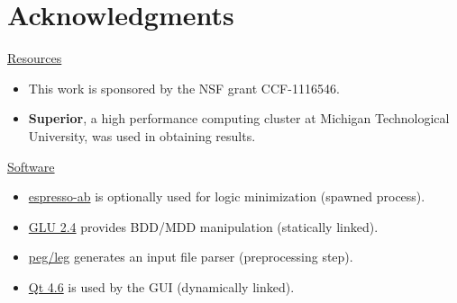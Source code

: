 
\section{Acknowledgments}

\underline{Resources}
\begin{itemize}
\item This work is sponsored by the NSF grant CCF-1116546.
\item \textbf{Superior}, a high performance computing cluster at Michigan Technological University, was used in obtaining results.
\end{itemize}

\underline{Software}
\begin{itemize}
\item \href{http://code.google.com/p/eqntott/downloads/detail?name=espresso-ab-1.0.tar.gz}{espresso-ab} is optionally used for logic minimization (spawned process).
\item \href{http://vlsi.colorado.edu/~vis/Readme/README.glu}{GLU 2.4} provides BDD/MDD manipulation (statically linked).
\item \href{http://piumarta.com/software/peg/}{peg/leg} generates an input file parser (preprocessing step).
\item \href{http://qt-project.org/}{Qt 4.6} is used by the GUI (dynamically linked).
\end{itemize}

